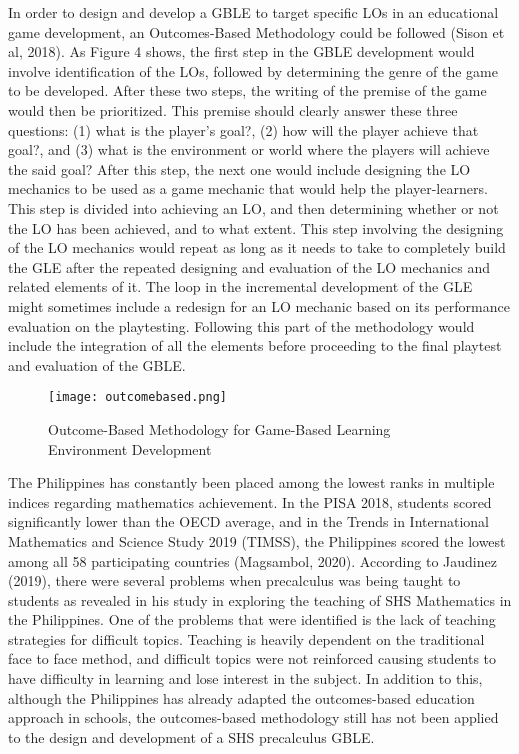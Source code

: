 In order to design and develop a GBLE to target specific LOs in an educational game development, an Outcomes-Based Methodology could be followed (Sison et al, 2018). As Figure 4 shows, the first step in the GBLE development would involve identification of the LOs, followed by determining the genre of the game to be developed. After these two steps, the writing of the premise of the game would then be prioritized. This premise should clearly answer these three questions: (1) what is the player’s goal?, (2) how will the player achieve that goal?, and (3) what is the environment or world where the players will achieve the said goal? After this step, the next one would include designing the LO mechanics to be used as a game mechanic that would help the player-learners. This step is divided into achieving an LO, and then determining whether or not the LO has been achieved, and to what extent. This step involving the designing of the LO mechanics would repeat as long as it needs to take to completely build the GLE after the repeated designing and evaluation of the LO mechanics and related elements of it. The loop in the incremental development of the GLE might sometimes include a redesign for an LO mechanic based on its performance evaluation on the playtesting. Following this part of the methodology would include the integration of all the elements before proceeding to the final playtest and evaluation of the GBLE.

\begin{figure}[h]
   \centering                    
   \texttt{[image: outcomebased.png]}
   \caption{Outcome-Based Methodology for Game-Based Learning Environment Development}
    \label{fig:outcomebased}
\end{figure}

The Philippines has constantly been placed among the lowest ranks in multiple indices regarding mathematics achievement. In the PISA 2018, students scored significantly lower than the OECD average, and in the Trends in International Mathematics and Science Study 2019 (TIMSS), the Philippines scored the lowest among all 58 participating countries (Magsambol, 2020). According to Jaudinez (2019), there were several problems when precalculus was being taught to students as revealed in his study in exploring the teaching of SHS Mathematics in the Philippines. One of the problems that were identified is the lack of teaching strategies for difficult topics. Teaching is heavily dependent on the traditional face to face method, and difficult topics were not reinforced causing students to have difficulty in learning and lose interest in the subject. In addition to this, although the Philippines has already adapted the outcomes-based education approach in schools, the outcomes-based methodology still has not been applied to the design and development of a SHS precalculus GBLE.

